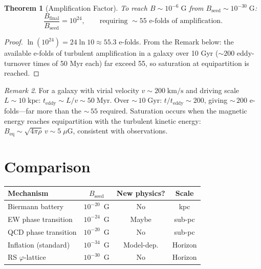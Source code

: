 \documentclass[12pt,a4paper]{article}
\newtheorem{theorem}{Theorem}[section]
\theoremstyle{definition}
\theoremstyle{remark}
\newtheorem{remark}[theorem]{Remark}
\begin{document}
\begin{theorem}[Amplification Factor]
To reach $B \sim 10^{-6}\;\mathrm{G}$ from
$B_{\mathrm{seed}} \sim 10^{-30}\;\mathrm{G}$:
\begin{equation}
  \frac{B_{\mathrm{final}}}{B_{\mathrm{seed}}} = 10^{24},
  \qquad \text{requiring } \sim 55\text{ e-folds of amplification}.
\end{equation}
\end{theorem}

\begin{proof}
$\ln(10^{24}) = 24\ln 10 \approx 55.3$ e-folds.  From the Remark
below: the available e-folds of turbulent amplification in a galaxy
over 10 Gyr ($\sim 200$ eddy-turnover times of 50 Myr each) far
exceed 55, so saturation at equipartition is reached.
\end{proof}

\begin{remark}
For a galaxy with virial velocity $v \sim 200\;\mathrm{km/s}$ and
driving scale $L \sim 10\;\mathrm{kpc}$:
$t_{\mathrm{eddy}} \sim L/v \sim 50\;\mathrm{Myr}$.  Over
${\sim}\,10\;\mathrm{Gyr}$: $t/t_{\mathrm{eddy}} \sim 200$,
giving ${\sim}\,200$ e-folds---far more than the ${\sim}\,55$
required.  Saturation occurs when the magnetic energy reaches
equipartition with the turbulent kinetic energy:
$B_{\mathrm{eq}} \sim \sqrt{4\pi\rho}\,v \sim 5\;\mu\mathrm{G}$,
consistent with observations.
\end{remark}

\section{Comparison}
\label{sec:comparison}

\begin{center}
\renewcommand{\arraystretch}{1.3}
\begin{tabular}{@{}lccc@{}}
\toprule
\textbf{Mechanism} & $B_{\mathrm{seed}}$ &
\textbf{New physics?} & \textbf{Scale} \\
\midrule
Biermann battery & $10^{-20}$~G & No & kpc \\
EW phase transition & $10^{-24}$~G & Maybe & sub-pc \\
QCD phase transition & $10^{-20}$~G & No & sub-pc \\
Inflation (standard) & $10^{-34}$~G & Model-dep. & Horizon \\
RS $\varphi$-lattice & $10^{-30}$~G & No & Horizon \\
\bottomrule
\end{tabular}
\end{center}
\end{document}

